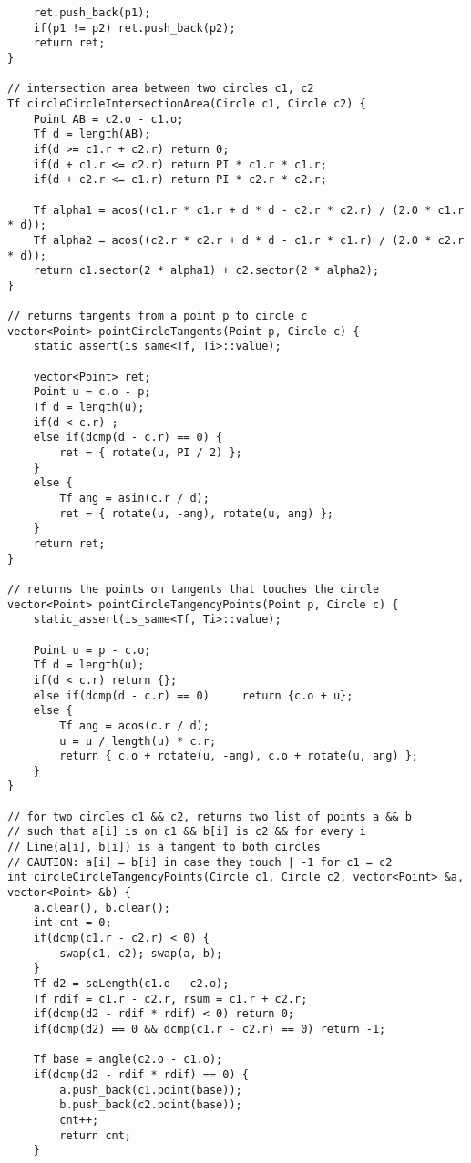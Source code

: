 \documentclass[FSZ,a4paper,onesided]{article}
\begin{document}
\begin{multicols*}{\COLS}
\begin{lstlisting}
    ret.push_back(p1);
    if(p1 != p2) ret.push_back(p2);
    return ret;
}

// intersection area between two circles c1, c2
Tf circleCircleIntersectionArea(Circle c1, Circle c2) {
    Point AB = c2.o - c1.o;
    Tf d = length(AB);
    if(d >= c1.r + c2.r) return 0;
    if(d + c1.r <= c2.r) return PI * c1.r * c1.r;
    if(d + c2.r <= c1.r) return PI * c2.r * c2.r;

    Tf alpha1 = acos((c1.r * c1.r + d * d - c2.r * c2.r) / (2.0 * c1.r * d));
    Tf alpha2 = acos((c2.r * c2.r + d * d - c1.r * c1.r) / (2.0 * c2.r * d));
    return c1.sector(2 * alpha1) + c2.sector(2 * alpha2);
}

// returns tangents from a point p to circle c
vector<Point> pointCircleTangents(Point p, Circle c) {
    static_assert(is_same<Tf, Ti>::value);

    vector<Point> ret;
    Point u = c.o - p;
    Tf d = length(u);
    if(d < c.r) ;
    else if(dcmp(d - c.r) == 0) {
        ret = { rotate(u, PI / 2) };
    }
    else {
        Tf ang = asin(c.r / d);
        ret = { rotate(u, -ang), rotate(u, ang) };
    }
    return ret;
}

// returns the points on tangents that touches the circle
vector<Point> pointCircleTangencyPoints(Point p, Circle c) {
    static_assert(is_same<Tf, Ti>::value);

    Point u = p - c.o;
    Tf d = length(u);
    if(d < c.r) return {};
    else if(dcmp(d - c.r) == 0)     return {c.o + u};
    else {
        Tf ang = acos(c.r / d);
        u = u / length(u) * c.r;
        return { c.o + rotate(u, -ang), c.o + rotate(u, ang) };
    }
}

// for two circles c1 && c2, returns two list of points a && b
// such that a[i] is on c1 && b[i] is c2 && for every i
// Line(a[i], b[i]) is a tangent to both circles
// CAUTION: a[i] = b[i] in case they touch | -1 for c1 = c2
int circleCircleTangencyPoints(Circle c1, Circle c2, vector<Point> &a, vector<Point> &b) {
    a.clear(), b.clear();
    int cnt = 0;
    if(dcmp(c1.r - c2.r) < 0) {
        swap(c1, c2); swap(a, b);
    }
    Tf d2 = sqLength(c1.o - c2.o);
    Tf rdif = c1.r - c2.r, rsum = c1.r + c2.r;
    if(dcmp(d2 - rdif * rdif) < 0) return 0;
    if(dcmp(d2) == 0 && dcmp(c1.r - c2.r) == 0) return -1;

    Tf base = angle(c2.o - c1.o);
    if(dcmp(d2 - rdif * rdif) == 0) {
        a.push_back(c1.point(base));
        b.push_back(c2.point(base));
        cnt++;
        return cnt;
    }


\end{lstlisting}
\end{multicols*}
\end{document}
